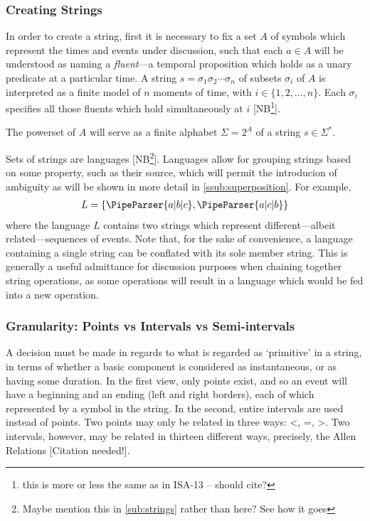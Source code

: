 \documentclass[a4paper,12pt,leqno]{article}
\newcommand{\vph}[1]{\vphantom{#1}}
\newcommand{\ebox}[1]{\fbox{$\vph{'(),}#1$}}
\newcommand{\EventString}[1]{
	\renewcommand*{\do}[1]{\ebox{##1}}%
	\PipeParser{#1}
}
\newcommand{\citeneeded}[1][]{{\color{red}[Citation needed!#1]}}
\newcommand{\selfnote}[1]{{\color{red}[NB\footnote{{\color{red}#1}}]}}
\newcommand{\nb}{\selfnote}
\begin{document}
\subsubsection{Creating Strings}\label{ssub:creating}
In order to create a string, first it is necessary to fix a set $A$ of symbols which represent the times and events under discussion, such that each $a \in A$ will be understood as naming a \textit{fluent}---a temporal proposition which holds as a unary predicate at a particular time. A string $s = \sigma_1\sigma_2\cdots\sigma_n$ of subsets $\sigma_i$ of $A$ is interpreted as a finite model of $n$ moments of time, with $i \in \{1, 2, \ldots, n\}$. Each $\sigma_i$ specifies all those fluents which hold simultaneously at $i$ \nb{this is more or less the same as in ISA-13 -- should cite?}.

The powerset of $A$ will serve as a finite alphabet $\Sigma = 2^A$ of a string $s \in \Sigma^*$.

Sets of strings are languages \selfnote{Maybe mention this in \ref{sub:strings} rather than here? See how it goes}. Languages allow for grouping strings based on some property, such as their source, which will permit the introducion of ambiguity as will be shown in more detail in \ref{ssub:superposition}. For example,
\begin{align}
	L = \{\EventString{a|b|c}, \EventString{a|c|b}\}
\end{align}
where the language $L$ contains two strings which represent different---albeit related---sequences of events. Note that, for the sake of convenience, a language containing a single string can be conflated with its sole member string. This is generally a useful admittance for discussion purposes when chaining together string operations, as some operations will result in a language which would be fed into a new operation.

\subsubsection{Granularity: Points vs Intervals vs Semi-intervals}\label{ssub:granularity}
A decision must be made in regards to what is regarded as `primitive' in a string, in terms of whether a basic component is considered as instantaneous, or as having some duration. In the first view, only points exist, and so an event will have a beginning and an ending (left and right borders), each of which represented by a symbol in the string. In the second, entire intervals are used instead of points. Two points may only be related in three ways: \textless, =, \textgreater. Two intervals, however, may be related in thirteen different ways, precisely, the Allen Relations \citeneeded{}. 
\end{document}
